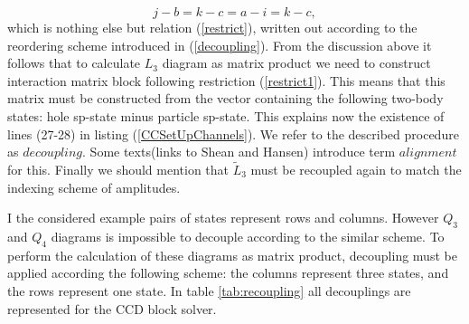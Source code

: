 \documentclass[twoside,english]{uiofysmaster}
\begin{document}
\begin{equation}\label{restrict1}
j - b = k - c = a - i = k - c,
\end{equation}
which is nothing else but relation (\ref{restrict}), written out according to the reordering scheme introduced in (\ref{decoupling}).
From the discussion above it follows that to calculate $L_3$ diagram as matrix product we need to construct interaction matrix block following restriction (\ref{restrict1}). This means that this matrix must be constructed from the vector containing the following two-body states: hole sp-state minus particle sp-state. This explains now the existence of lines (27-28) in listing (\ref{CCSetUpChannels}). We refer to the described procedure as $decoupling$. Some texts(links to Shean and Hansen) introduce term $alignment$ for this.
Finally we should mention that $\tilde{L}_3$ must be recoupled again to match the indexing scheme of amplitudes.

I the considered example pairs of states represent rows and columns. However $Q_3$ and $Q_4$ diagrams is impossible to decouple according to the similar scheme. To perform the calculation of these diagrams as matrix product, decoupling must be applied according the following scheme: the columns represent three states, and the rows represent one state. In table \ref{tab:recoupling} all decouplings are represented for the CCD block solver.
\end{document}
